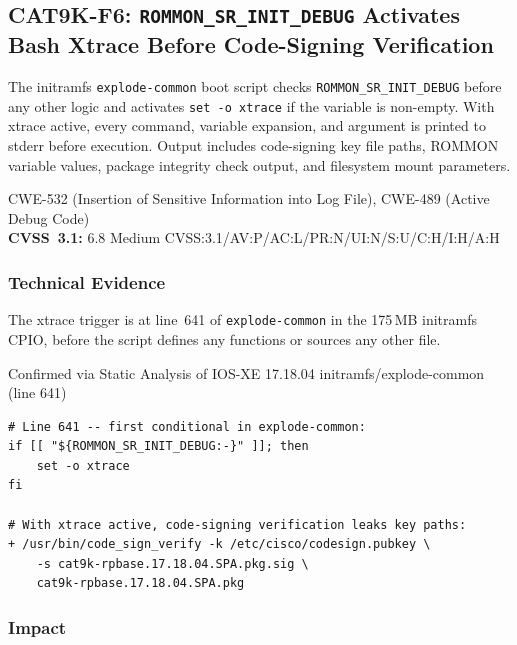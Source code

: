 \documentclass[11pt,a4paper]{article}
\begin{document}
\subsection{CAT9K-F6: \texorpdfstring{\texttt{ROMMON\_SR\_INIT\_DEBUG}}{ROMMON\_SR\_INIT\_DEBUG} Activates Bash Xtrace Before Code-Signing Verification}

\begin{overviewbox}
The initramfs \texttt{explode-common} boot script checks \texttt{ROMMON\_SR\_INIT\_DEBUG}
before any other logic and activates \texttt{set -o xtrace} if the variable is non-empty.
With xtrace active, every command, variable expansion, and argument is printed to stderr
before execution. Output includes code-signing key file paths, ROMMON variable values,
package integrity check output, and filesystem mount parameters.

CWE-532 (Insertion of Sensitive Information into Log File), CWE-489 (Active Debug Code)\\
\textbf{CVSS~3.1:} 6.8 Medium \quad CVSS:3.1/AV:P/AC:L/PR:N/UI:N/S:U/C:H/I:H/A:H
\end{overviewbox}

\subsubsection{Technical Evidence}

The xtrace trigger is at line~641 of \texttt{explode-common} in the 175\,MB initramfs
CPIO, before the script defines any functions or sources any other file.

\begin{pocbox}{Confirmed via Static Analysis of IOS-XE 17.18.04 initramfs/explode-common (line 641)}
\begin{lstlisting}[style=bash]
# Line 641 -- first conditional in explode-common:
if [[ "${ROMMON_SR_INIT_DEBUG:-}" ]]; then
    set -o xtrace
fi

# With xtrace active, code-signing verification leaks key paths:
+ /usr/bin/code_sign_verify -k /etc/cisco/codesign.pubkey \
    -s cat9k-rpbase.17.18.04.SPA.pkg.sig \
    cat9k-rpbase.17.18.04.SPA.pkg
\end{lstlisting}
\end{pocbox}

\subsubsection{Impact}
\end{document}
